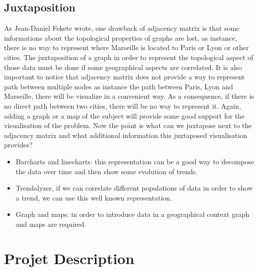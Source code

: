 \documentclass{vgtc}
\begin{document}
\subsection{Juxtaposition}
\indent
As Jean-Daniel Fekete\cite{Fekete} wrote, one drawback of adjacency matrix is that some informations about the topological properties of graphs are lost, as instance, there is no way to represent where Marseille is located to Paris or Lyon or other cities. The juxtaposition of a graph in order to represent the topological aspect of those data must be done if some geographical aspects are correlated. It is also important to notice that adjacency matrix does not provide a way to represent path between multiple nodes as instance the path between Paris, Lyon and Marseille, there will be visualize in a convenient way. As a consequence, if there is no direct path between two cities, there will be no way to represent it. Again, adding a graph or a map of the subject will provide some good support for the visualisation of the problem. 
Now the point is what can we juxtapose next to the adjacency matrix and what additional information this juxtaposed visualisation provides?
\begin{itemize}
\item Barcharts and linecharts: this representation can be a good way to decompose the data over time and then show some evolution of trends.
\item Trendalyzer, if we can correlate different populations of data in order to show a trend, we can use this well known representation.
\item Graph and maps: in order to introduce data in a geographical context graph and maps are required.
\end{itemize}
\section{Projet Description}
\end{document}
